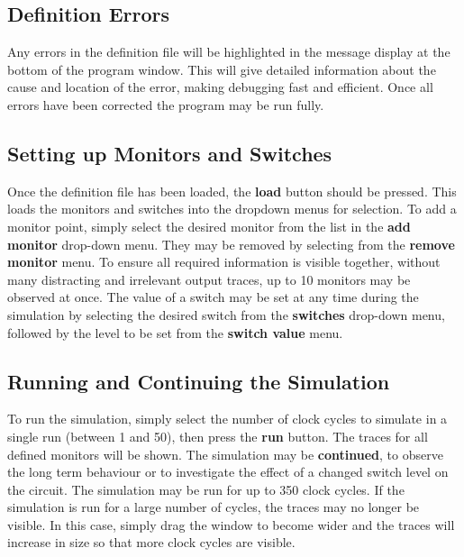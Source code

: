 \documentclass[a4paper,10pt]{article}  %
\begin{document}
\subsection{Definition Errors}

Any errors in the definition file will be highlighted in the message
display at the bottom of the program window. This will give detailed
information about the cause and location of the error, making
debugging fast and efficient. Once all errors have been corrected the
program may be run fully.

\subsection{Setting up Monitors and Switches}

Once the definition file has been loaded, the \textbf{load} button
should be pressed. This loads the monitors and switches into the
dropdown menus for selection. To add a monitor point, simply select
the desired monitor from the list in the \textbf{add monitor}
drop-down menu. They may be removed by selecting from the
\textbf{remove monitor} menu. To ensure all required information is
visible together, without many distracting and irrelevant output
traces, up to 10 monitors may be observed at once. The value of a
switch may be set at any time during the simulation by selecting the
desired switch from the \textbf{switches} drop-down menu, followed by
the level to be set from the \textbf{switch value} menu.

\subsection{Running and Continuing the Simulation}

To run the simulation, simply select the number of clock cycles to
simulate in a single run (between 1 and 50), then press the
\textbf{run} button. The traces for all defined monitors will be
shown. The simulation may be \textbf{continued}, to observe the long
term behaviour or to investigate the effect of a changed switch level
on the circuit. The simulation may be run for up to 350 clock
cycles. If the simulation is run for a large number of cycles, the
traces may no longer be visible. In this case, simply drag the window
to become wider and the traces will increase in size so that more
clock cycles are visible.
\end{document}

